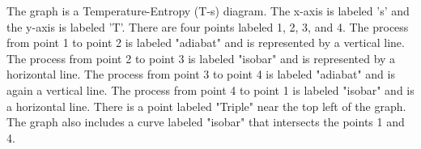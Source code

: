 The graph is a Temperature-Entropy (T-s) diagram. The x-axis is labeled 's' and the y-axis is labeled 'T'. There are four points labeled 1, 2, 3, and 4. The process from point 1 to point 2 is labeled "adiabat" and is represented by a vertical line. The process from point 2 to point 3 is labeled "isobar" and is represented by a horizontal line. The process from point 3 to point 4 is labeled "adiabat" and is again a vertical line. The process from point 4 to point 1 is labeled "isobar" and is a horizontal line. There is a point labeled "Triple" near the top left of the graph. The graph also includes a curve labeled "isobar" that intersects the points 1 and 4.